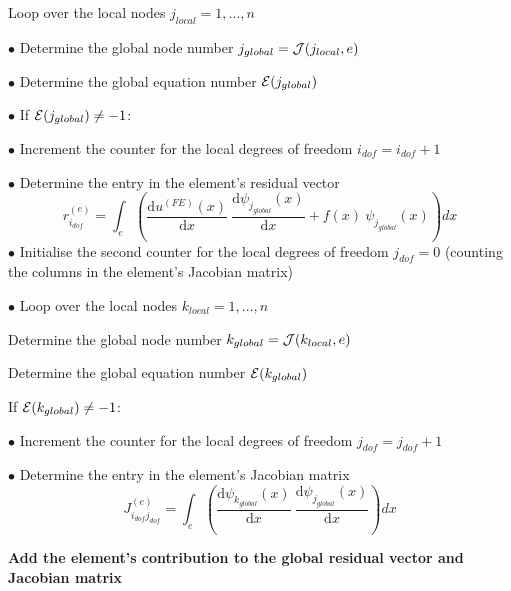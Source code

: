 \begin{DoxyItemize}
\begin{DoxyItemize}
\item Loop over the local nodes $ j_{local}=1,...,n $ \par
 $ \bullet $ Determine the global node number $ j_{global}={\cal J}(j_{local},e)$ \par
 $ \bullet $ Determine the global equation number $ {\cal E}( j_{global}) $ \par
 $ \bullet $ If $ {\cal E}( j_{global}) \ne -1 $\-: \begin{TabularC}{1}
\hline
$ \bullet $ Increment the counter for the local degrees of freedom $ i_{dof}= i_{dof}+1$   \\
\end{TabularC}
$ \bullet $ Determine the entry in the element's residual vector \[ r_{i_{dof}}^{(e)} = \int_{e} \left( \frac{\mbox{d} u^{(FE)}(x)}{\mbox{d} x} \ \frac{\mbox{d} \psi_{j_{global}}(x)}{\mbox{d} x} + f(x) \ \psi_{j_{global}}(x) \right) dx \] $ \bullet $ Initialise the second counter for the local degrees of freedom $ j_{dof}=0$ (counting the columns in the element's Jacobian matrix) \par
\par
 $ \bullet $ Loop over the local nodes $ k_{local}=1,...,n $
\begin{DoxyItemize}
\item Determine the global node number $ k_{global}={\cal J}(k_{local},e)$
\item Determine the global equation number $ {\cal E}( k_{global}) $
\item If $ {\cal E}( k_{global}) \ne -1 $\-: \begin{TabularC}{1}
\hline
$ \bullet $ Increment the counter for the local degrees of freedom $ j_{dof}= j_{dof}+1$   \\
\end{TabularC}
$ \bullet $ Determine the entry in the element's Jacobian matrix \[ J_{i_{dof}j_{dof}}^{(e)} = \int_{e} \left( \frac{\mbox{d} \psi_{k_{global}}(x)}{\mbox{d} x} \ \frac{\mbox{d} \psi_{j_{global}}(x)}{\mbox{d} x} \right) dx \]
\end{DoxyItemize}
\end{DoxyItemize}\par
 \par
 \begin{center} {\bfseries  Add the element's contribution to the global residual vector and Jacobian matrix } \end{center}  \par


\end{DoxyItemize}
